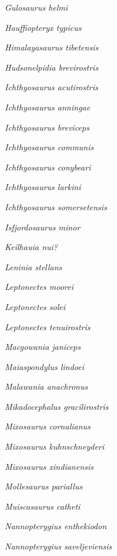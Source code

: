 \emph{Gulosaurus helmi}~

\emph{Hauffiopteryx typicus}~

\emph{Himalayasaurus tibetensis}~

\emph{Hudsonelpidia brevirostris}~

\emph{Ichthyosaurus acutirostris}~

\emph{Ichthyosaurus anningae}~

\emph{Ichthyosaurus breviceps}~

\emph{Ichthyosaurus communis}~

\emph{Ichthyosaurus conybeari}~

\emph{Ichthyosaurus larkini}~

\emph{Ichthyosaurus somersetensis}~

\emph{Isfjordosaurus minor}~

\emph{Keilhauia nui?}~

\emph{Leninia stellans}~

\emph{Leptonectes moorei}~

\emph{Leptonectes solei}~

\emph{Leptonectes tenuirostris}~

\emph{Macgowania janiceps}~

\emph{Maiaspondylus lindoei}~

\emph{Malawania anachronus}~

\emph{Mikadocephalus gracilirostris}~

\emph{Mixosaurus cornalianus}~

\emph{Mixosaurus kuhnschneyderi}~

\emph{Mixosaurus xindianensis}~

\emph{Mollesaurus pariallus}~

\emph{Muiscasaurus catheti}~

\emph{Nannopterygius enthekiodon}~

\emph{Nannopterygius saveljeviensis}~

